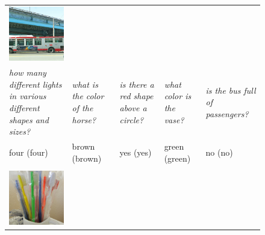 \begin{figure}
\begin{tabular}{>{\raggedright}*{5}{p{.17\textwidth}}}
    \includegraphics[width=\linewidth]{fig/thumb/vqa2.jpg} \\
    \emph{how many different lights in various different shapes and sizes?} &
    \emph{what is the color of the horse?} &
    \emph{is there a red shape above a circle?} &
    \emph{what color is the vase?} &
    \emph{is the bus full of passengers?} \\
    \midrule
    four (four) &
    brown (brown) &
    yes (yes) &
    green (green) &
    no (no) \\
    \bottomrule
    \\[1em]
    \toprule
    \includegraphics[width=\linewidth]{fig/thumb/cocoqa3.jpg} &

\end{tabular}
\end{figure}
